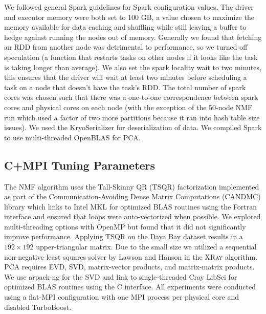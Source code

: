 We followed general Spark guidelines for Spark configuration values. The driver and executor memory were both set to 100 GB, a value chosen to maximize the memory available for data caching and shuffling while still leaving a buffer to hedge against running the nodes out of memory.  Generally we found that fetching an RDD from another node was detrimental to performance, so we turned off speculation (a function that restarts tasks on other nodes if it looks like the task is taking longer than average). We also set the spark locality wait to two minutes, this ensures that the driver will wait at least two minutes before scheduling a task on a node that doesn't have the task's RDD. The total number of spark cores was chosen such that there was a one-to-one correspondence between spark cores and physical cores on each node (with the exception of the 50-node NMF run which used a factor of two more partitions because it ran into hash table size issues). We used the KryoSerializer for deserialization of data. We compiled Spark to use multi-threaded OpenBLAS for PCA.

\subsection{C+MPI Tuning Parameters}
The NMF algorithm uses the Tall-Skinny QR (TSQR) \cite{ballard14,demmel12} factorization implemented as part of the Communication-Avoiding Dense Matrix Computations (CANDMC) library \cite{Solomonik14} which links to Intel MKL for optimized BLAS routines using the Fortran interface and ensured that loops were auto-vectorized when possible. We explored multi-threading options with OpenMP but found that it did not significantly improve performance. Applying TSQR on the Daya Bay dataset results in a $192 \times 192$ upper-triangular matrix. Due to the small size we utilized a sequential non-negative least squares solver by Lawson and Hanson \cite{lawson95} in the \textsc{XRay} algorithm. PCA requires EVD, SVD, matrix-vector products, and matrix-matrix products. We use arpack-ng \cite{Lehoucq97} for the SVD and link to single-threaded Cray LibSci for optimized BLAS routines using the C interface. All experiments were conducted using a flat-MPI configuration with one MPI process per physical core and disabled TurboBoost.